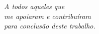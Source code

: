 \begin{dedicatoria}
   \vspace*{\fill}
   \centering
   \noindent
	 \textit{A todos aqueles que \\ 
                        me apoiaram e contribuíram \\ 
                        para conclusão deste trabalho.} \vspace*{\fill}
\end{dedicatoria}

